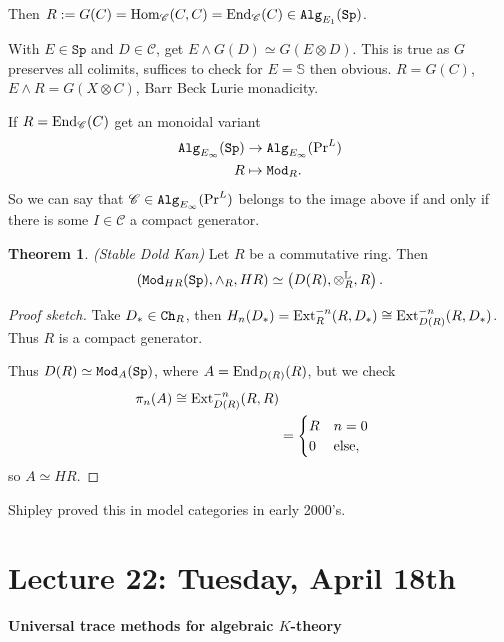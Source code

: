 \documentclass[12pt]{amsart}
\theoremstyle{definition}
\newtheorem{theorem}{Theorem}[section]
\let\smashprod\wedge
\providecommand{\Sp}{\texttt{Sp}}
\providecommand{\Sp}{\text{Sp}}
\providecommand{\Pr}{\text{Pr}}
\begin{document}
Then $R:= G(C) = \Hom_\mathscr{C}(C,C) = \End_\mathscr{C}(C) \in \Alg_{E_1}(\Sp)$.

With $E\in \Sp$ and $D\in \mathscr{C}$, get $E \smashprod G(D) \simeq G(E \otimes D)$. This is true as $G$ preserves all colimits, suffices to check for $E = \mathbb{S}$ then obvious. $R = G(C)$, $E \smashprod R = G(X \otimes C)$, Barr Beck Lurie monadicity.

If $R = \text{End}_\mathscr{C}(C)$ get an monoidal variant
\begin{align*}
    \Alg_{E_\infty}(\Sp) &\to \Alg_{E_\infty}(\Pr^L) \\
    R &\mapsto \Mod_R.
\end{align*}
So we can say that $\mathscr{C}\in \Alg_{E_\infty}(\Pr^L)$ belongs to the image above if and only if there is some $I \in \mathscr{C}$ a compact generator.

\begin{theorem} \textit{(Stable Dold Kan)} Let $R$ be a commutative ring. Then
\begin{align*}
    \left( \Mod_{HR}(\Sp), \smashprod_R, HR \right)\simeq \left( D(R), \otimes_R^{\mathbb{L}}, R \right).
\end{align*}
\end{theorem}
\begin{proof}[Proof sketch] Take $D_\ast \in \texttt{Ch}_R$, then $H_n(D_\ast) = \text{Ext}^{-n}_R(R,D_\ast) \cong \text{Ext}_{D(R)}^{-n}(R,D_\ast)$. Thus $R$ is a compact generator.

Thus $D(R) \simeq \Mod_A(\Sp)$, where $A = \text{End}_{D(R)}(R)$, but we check
\begin{align*}
    \pi_n(A) \cong \text{Ext}_{D(R)}^{-n}(R,R) \\
    &= \begin{cases} R & n=0 \\ 0 & \text{else}, \end{cases}
\end{align*}
so $A \simeq HR$.
\end{proof}

Shipley proved this in model categories in early 2000's.

\section{Lecture 22: Tuesday, April 18th}

\begin{center}
    \textbf{Universal trace methods for algebraic $K$-theory}
\end{center}
\end{document}
